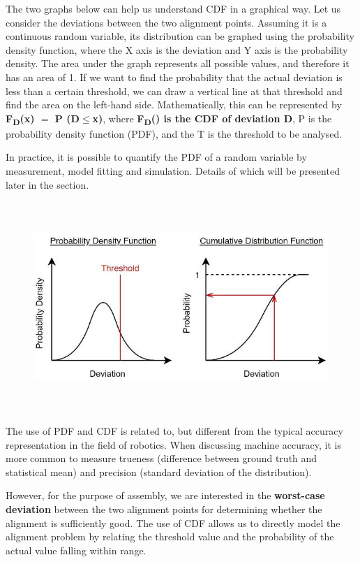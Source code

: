 \documentclass[11pt]{book}
\begin{document}
The two graphs below can help us understand CDF in a graphical way. Let us consider the deviations between the two alignment points. Assuming it is a continuous random variable, its distribution can be graphed using the probability density function, where the X axis is the deviation and Y axis is the probability density. The area under the graph represents all possible values, and therefore it has an area of 1. If we want to find the probability that the actual deviation is less than a certain threshold, we can draw a vertical line at that threshold and find the area on the left-hand side. Mathematically, this can be represented by \textbf{F\textsubscript{D}(x) $=$ P (D$\leq$x)}, where \textbf{F\textsubscript{D}() is the CDF of deviation D}, P is the probability density function (PDF), and the T is the threshold to be analysed.

In practice, it is possible to quantify the PDF of a random variable by measurement, model fitting and simulation. Details of which will be presented later in the section.

\begin{figure}[H]
\includegraphics[width=15.92cm,height=7.94cm]{./images/image2.jpeg}
\end{figure}


\vspace{1\baselineskip}
The use of PDF and CDF is related to, but different from the typical accuracy representation in the field of robotics. When discussing machine accuracy, it is more common to measure trueness (difference between ground truth and statistical mean) and precision (standard deviation of the distribution). 

However, for the purpose of assembly, we are interested in the \textbf{worst-case deviation }between the two alignment points for determining whether the alignment is sufficiently good. The use of CDF allows us to directly model the alignment problem by relating the threshold value and the probability of the actual value falling within range. 
\end{document}

